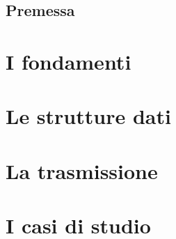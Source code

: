 \documentclass[11pt,a4paper,oneside]{report}
\begin{document}


\chapter*{Premessa}


\tableofcontents

\part{I fondamenti}






\part{Le strutture dati}





\part{La trasmissione}





\part{I casi di studio}







\end{document}
